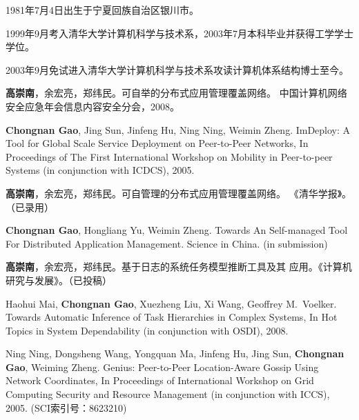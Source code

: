 \begin{resume}


  1981年7月4日出生于宁夏回族自治区银川市。

  1999年9月考入清华大学计算机科学与技术系，2003年7月本科毕业并获得工学学士学位。

  2003年9月免试进入清华大学计算机科学与技术系攻读计算机体系结构博士至今。


  \begin{enumerate}[{[}1{]}]

  \item \textbf{高崇南}，余宏亮，郑纬民。可自举的分布式应用管理覆盖网络。
  中国计算机网络安全应急年会信息内容安全分会，2008。

  \item \textbf{Chongnan Gao}, Jing Sun, Jinfeng Hu, Ning Ning, Weimin
  Zheng.  ImDeploy: A Tool for Global Scale Service Deployment on
  Peer-to-Peer Networks, In Proceedings of The First International Workshop
  on Mobility in Peer-to-peer Systems (in conjunction with ICDCS), 2005.

  \item \textbf{高崇南}，余宏亮，郑纬民。可自管理的分布式应用管理覆盖网络。
  《清华学报》。（已录用）

  \item \textbf{Chongnan Gao}, Hongliang Yu, Weimin Zheng. Towards An
  Self-managed Tool For Distributed Application Management. Science in
  China. (in submission)

  \item \textbf{高崇南}，余宏亮，郑纬民。基于日志的系统任务模型推断工具及其
  应用。《计算机研究与发展》。（已投稿）

  \item Haohui Mai, \textbf{Chongnan Gao}, Xuezheng Liu, Xi Wang, Geoffrey
  M.\ Voelker. Towards Automatic Inference of Task Hierarchies in Complex
  Systems, In Hot Topics in System Dependability (in conjunction with OSDI),
  2008.

  \item Ning Ning, Dongsheng Wang, Yongquan Ma, Jinfeng Hu, Jing Sun,
  \textbf{Chongnan Gao}, Weiming Zheng. Genius: Peer-to-Peer Location-Aware
  Gossip Using Network Coordinates, In Proceedings of International Workshop
  on Grid Computing Security and Resource Management (in conjunction with
  ICCS), 2005. (SCI索引号：8623210)


\end{enumerate}
\end{resume}

